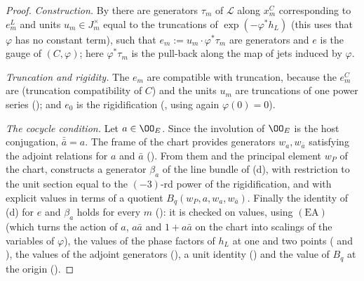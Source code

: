 \begin{proof}
\emph{Construction.} By  there are generators
$\tau_m$ of $\mathcal L$ along $x^C_m$ corresponding to $e^L_m$ and units $u_m\in J_m^\times$ equal to the truncations of
$\exp(-\varphi^*h_L)$ (this uses that $\varphi$ has no constant term), such that $e_m:=u_m\cdot\varphi^*\tau_m$ are
generators and $e$ is the gauge of $(C,\varphi)$; here $\varphi^*\tau_m$ is the pull-back along the map of jets induced by
$\varphi$.

\emph{Truncation and rigidity.} The $e_m$ are compatible with truncation, because the $e^C_m$ are (truncation compatibility of
$C$) and the units $u_m$ are truncations of one power series
(); and $e_0$ is the rigidification
(, using again $\varphi(0)=0$).

\emph{The cocycle condition.} Let $a\in\OO_E$. Since the involution of $\OO_E$ is the host conjugation, $\bar{\bar a}=a$.
The frame of the chart provides generators $w_a,w_{\bar a}$ satisfying the adjoint relations for $a$ and $\bar a$
(). From them and the principal element $w_P$ of
the chart,  constructs a generator $\beta_a$ of the
line bundle of (d), with restriction to the unit section equal to the $(-3)$-rd power of the rigidification, and with
explicit values in terms of a quotient $B_q(w_P,a,w_a,w_{\bar a})$. Finally the identity of (d) for $e$ and $\beta_a$ holds
for every $m$ (): it is checked on values, using
$(\mathrm{EA})$ (which turns the action of $a$, $a\bar a$ and $1+a\bar a$ on the chart into scalings of the variables of
$\varphi$), the values of the phase factors of $h_L$ at one and two points
( and ),
the values of the adjoint generators (), a unit identity
() and the value of $B_q$ at the origin
().
\end{proof}

